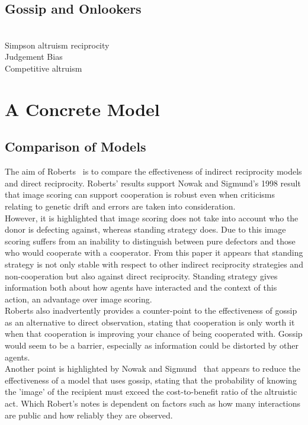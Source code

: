 \documentclass[twoside,twocolumn]{article}
\begin{document}
\subsection{Gossip and Onlookers}
~\cite{gossip_alt}\\

Simpson altruism reciprocity\\
Judgement Bias\\
Competitive altruism\\


\section{A Concrete Model}
\subsection{Comparison of Models}
The aim of Roberts~\cite{evoldirindir} is to compare the effectiveness of indirect reciprocity models and direct reciprocity. Roberts' results support Nowak and Sigmund's 1998 result that image scoring can support cooperation is robust even when criticisms relating to genetic drift and errors are taken into consideration.\\
However, it is highlighted that image scoring does not take into account who the donor is defecting against, whereas standing strategy does. Due to this image scoring suffers from an inability to distinguish between pure defectors and those who would cooperate with a cooperator. From this paper it appears that standing strategy is not only stable with respect to other indirect reciprocity strategies and non-cooperation but also against direct reciprocity. Standing strategy gives information both about how agents have interacted and the context of this action, an advantage over image scoring.\\
Roberts also inadvertently provides a counter-point to the effectiveness of gossip as an alternative to direct observation, stating that cooperation is only worth it when that cooperation is improving your chance of being cooperated with. Gossip would seem to be a barrier, especially as information could be distorted by other agents.\\
Another point is highlighted by Nowak and Sigmund~\cite{evol_indirect_image} that appears to reduce the effectiveness of a model that uses gossip, stating that the probability of knowing the 'image' of the recipient must exceed the cost-to-benefit ratio of the altruistic act. Which Robert's notes is dependent on factors such as how many interactions are public and how reliably they are observed.\\
\end{document}
